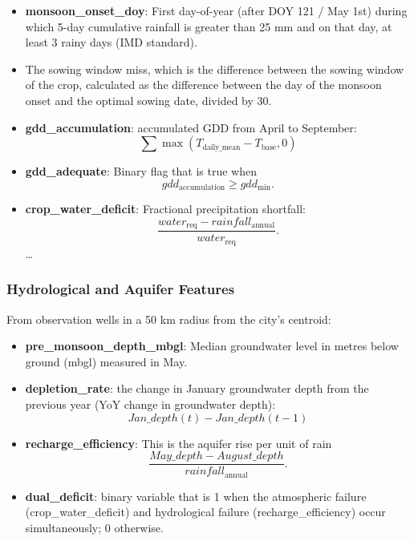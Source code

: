 \documentclass{ieeeaccess}
\begin{document}
\begin{itemize}
    \item \textbf{monsoon\_onset\_doy}: First day-of-year (after DOY 121 / May 1st) during which 5-day cumulative rainfall is greater than 25 mm and on that day, at least 3 rainy days (IMD standard).

    \item The sowing window miss, which is the difference between the sowing window of the crop, calculated as the difference between the day of the monsoon onset and the optimal sowing date, divided by 30.

    \item \textbf{gdd\_accumulation}: accumulated GDD from April to September:
    \[
    \sum \max(T_{\text{daily\_mean}} - T_{\text{base}},0)
    \]

    \item \textbf{gdd\_adequate}: Binary flag that is true when
    \[
    gdd_{\text{accumulation}} \ge gdd_{\min}.
    \]

    \item \textbf{crop\_water\_deficit}: Fractional precipitation shortfall:
    \[
    \frac{water_{\text{req}} - rainfall_{\text{annual}}}
         {water_{\text{req}}}.
    \]
\dots
\end{itemize}

\subsubsection{Hydrological and Aquifer Features}

From observation wells in a 50 km radius from the city's centroid:

\begin{itemize}
    \item \textbf{pre\_monsoon\_depth\_mbgl}: Median groundwater level in metres below ground (mbgl) measured in May.

    \item \textbf{depletion\_rate}: the change in January groundwater depth from the previous year (YoY change in groundwater depth):
    \[
    Jan\_depth(t) - Jan\_depth(t-1)
    \]

    \item \textbf{recharge\_efficiency}: This is the aquifer rise per unit of rain
    \[
    \frac{May\_depth - August\_depth}
         {rainfall_{\text{annual}}}.
    \]

    \item \textbf{dual\_deficit}: binary variable that is 1 when the atmospheric failure (crop\_water\_deficit) and hydrological failure (recharge\_efficiency) occur simultaneously; 0 otherwise.
\end{itemize}
\end{document}
